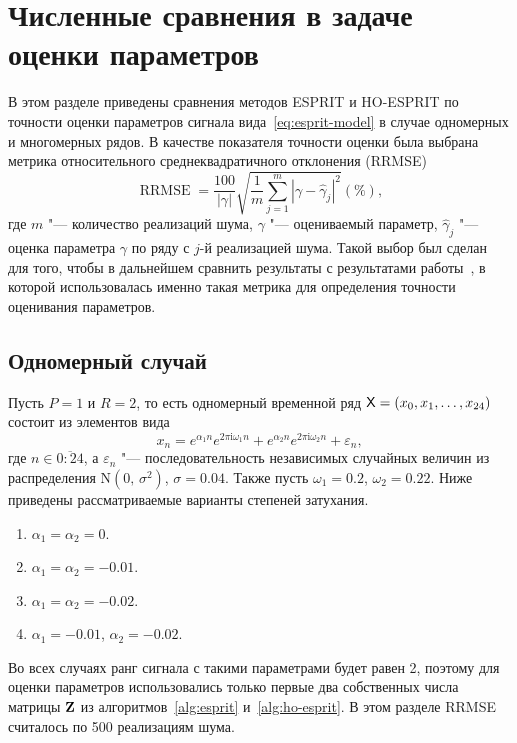 \documentclass[specialist,
  substylefile=spbu.rtx,
subf,href,colorlinks=true, 12pt]{disser}
\theoremstyle{plain}
\theoremstyle{definition}
\theoremstyle{remark}
\newcommand{\iu}{\mathrm{i}}
\begin{document}
\section{Численные сравнения в задаче оценки параметров}\label{sec:esprit-comparison}
В этом разделе приведены сравнения методов ESPRIT и HO-ESPRIT по точности оценки параметров сигнала
вида~\eqref{eq:esprit-model} в случае одномерных и многомерных рядов.
В качестве показателя точности оценки была выбрана метрика относительного среднеквадратичного
отклонения (RRMSE)
\begin{equation}
  \label{eq:rrmse}
  \operatorname{RRMSE} = \frac{100}{|\gamma|}\sqrt{\frac{1}{m} \sum_{j=1}^{m} \left|\gamma-\widehat{\gamma}_j\right|^2} (\%),
\end{equation}
где $m$ "--- количество реализаций шума, $\gamma$ "--- оцениваемый параметр, $\widehat{\gamma}_j$ "---
оценка параметра $\gamma$ по ряду с $j$-й реализацией шума.
Такой выбор был сделан для того, чтобы в дальнейшем сравнить результаты с результатами
работы~\cite{hosvd-hooi-separation}, в которой использовалась именно такая метрика для определения
точности оценивания параметров.

\subsection{Одномерный случай}\label{subsec:esprit-comparison}
Пусть $P=1$ и $R=2$, то есть одномерный временной ряд $\mathsf{X} = \left(x_0, x_1, \ldots, x_{24}\right)$
состоит из элементов вида
\[
  x_n = e^{ \alpha_1 n }
  e^{2 \pi\iu \omega_1 n} +
  e^{ \alpha_2 n }
  e^{ 2 \pi \iu \omega_2 n} + \varepsilon_n,
\]
где $n \in \overline{0:24}$, а $\varepsilon_n$ "--- последовательность независимых случайных величин из
распределения $\mathrm{N}(0,\, \sigma^2)$, $\sigma=0.04$.
Также пусть $\omega_1 = 0.2$, $\omega_2 = 0.22$.
Ниже приведены рассматриваемые варианты степеней затухания.
\begin{enumerate}
  \item\label{enum:esprit-no-rates} $\alpha_1=\alpha_2=0$.
  \item\label{enum:esprit-smalleq-rates} $\alpha_1=\alpha_2=-0.01$.
  \item\label{enum:esprit-bigeq-rates} $\alpha_1=\alpha_2=-0.02$.
  \item\label{enum:esprit-diff-rates} $\alpha_1= -0.01$, $\alpha_2=-0.02$.
\end{enumerate}
Во всех случаях ранг сигнала с такими параметрами будет равен 2, поэтому для оценки параметров
использовались только первые два собственных числа матрицы $\mathbf{Z}$ из алгоритмов~\ref{alg:esprit}
и~\ref{alg:ho-esprit}.
В этом разделе RRMSE считалось по 500 реализациям шума.
\end{document}
